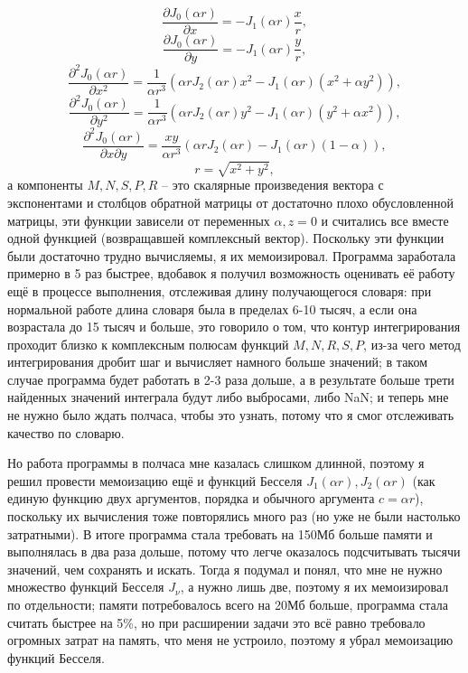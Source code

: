\documentclass[a4paper, 12pt]{article}
\newcommand{\jone}[1]{\frac{\partial J_0(\alpha r)}{\partial #1}}
\newcommand{\jtwo}[1]{\frac{\partial^2 J_0(\alpha r)}{\partial #1^2}}
\newcommand{\jxy}{\frac{\partial^2 J_0(\alpha r)}{\partial x \partial y}}
\begin{document}
\begin{equation}
    \jone{x}=-J_1(\alpha r)\frac{x}{r},
\end{equation}
\begin{equation}
    \jone{y}=-J_1(\alpha r)\frac{y}{r},
\end{equation}
\begin{equation}
    \jtwo{x}=\frac{1}{\alpha r^3}\left(\alpha r J_2(\alpha r)x^2-J_1(\alpha r)(x^2+\alpha y^2)\right),
\end{equation}
\begin{equation}
    \jtwo{y}=\frac{1}{\alpha r^3}\left(\alpha r J_2(\alpha r)y^2-J_1(\alpha r)(y^2+\alpha x^2)\right),
\end{equation}
\begin{equation}
    \jxy=\frac{xy}{\alpha r^3}\left(\alpha r J_2(\alpha r)-J_1(\alpha r)(1-\alpha)\right),
\end{equation}
\begin{equation}
    r=\sqrt{x^2+y^2},
\end{equation}
а компоненты $M,N,S,P,R$ -- это скалярные произведения вектора с экспонентами и столбцов обратной матрицы от достаточно плохо обусловленной матрицы, эти функции зависели от переменных $\alpha,z=0$ и считались все вместе одной функцией (возвращавшей комплексный вектор).
Поскольку эти функции были достаточно трудно вычисляемы, я их мемоизировал. Программа заработала примерно в 5 раз быстрее, вдобавок я получил возможность оценивать её работу ещё в процессе выполнения, отслеживая длину получающегося словаря: при нормальной работе длина словаря была в пределах 6-10 тысяч, а если она возрастала до 15 тысяч и больше, это говорило о том, что контур интегрирования проходит близко к комплексным полюсам функций $M,N,R,S,P$, из-за чего метод интегрирования дробит шаг и вычисляет намного больше значений; в таком случае программа будет работать в 2-3 раза дольше, а в результате больше трети найденных значений интеграла будут либо выбросами, либо NaN; и теперь мне не нужно было ждать полчаса, чтобы это узнать, потому что я смог отслеживать качество по словарю.

Но работа программы в полчаса мне казалась слишком длинной, поэтому я решил провести мемоизацию ещё и функций Бесселя $J_1(\alpha r), J_2(\alpha r)$ (как единую функцию двух аргументов, порядка и обычного аргумента $c=\alpha r$), поскольку их вычисления тоже повторялись много раз (но уже не были настолько затратными). В итоге программа стала требовать на 150Мб больше памяти и выполнялась в два раза дольше, потому что легче оказалось подсчитывать тысячи значений, чем сохранять и искать. 
Тогда я подумал и понял, что мне не нужно множество функций Бесселя $J_\nu$, а нужно лишь две, поэтому я их мемоизировал по отдельности; памяти потребовалось всего на 20Мб больше, программа стала считать быстрее на 5\%, но при расширении задачи это всё равно требовало огромных затрат на память, что меня не устроило, поэтому я убрал мемоизацию функций Бесселя. 
\end{document}
